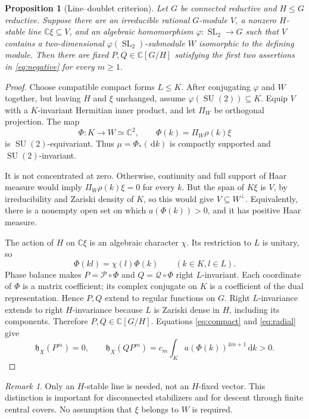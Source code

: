 \documentclass[11pt]{article}
\numberwithin{equation}{section}
\newtheorem{proposition}[theorem]{Proposition}
\theoremstyle{definition}
\theoremstyle{remark}
\newtheorem{remark}[theorem]{Remark}
\newcommand{\C}{\mathbb C}
\newcommand{\hX}{\mathfrak h_X}
\newcommand{\dd}{\,\mathrm d}
\DeclareMathOperator{\SL}{SL}
\DeclareMathOperator{\SU}{SU}
\begin{document}
\begin{proposition}[Line--doublet criterion]\label{prop:line}
Let $G$ be connected reductive and $H\leq G$ reductive. Suppose there are an irreducible rational $G$-module $V$, a nonzero $H$-stable line $\C\xi\subseteq V$, and an algebraic homomorphism $\varphi:\SL_2\to G$ such that $V$ contains a two-dimensional $\varphi(\SL_2)$-submodule $W$ isomorphic to the defining module. Then there are fixed $P,Q\in\C[G/H]$ satisfying the first two assertions in \eqref{eq:negative} for every $m\geq1$.
\end{proposition}
\begin{proof}
Choose compatible compact forms $L\leq K$. After conjugating $\varphi$ and $W$ together, but leaving $H$ and $\xi$ unchanged, assume $\varphi(\SU(2))\subseteq K$. Equip $V$ with a $K$-invariant Hermitian inner product, and let $\Pi_W$ be orthogonal projection. The map
\[
 \Phi:K\longrightarrow W\simeq\C^2,\qquad
 \Phi(k)=\Pi_W\rho(k)\xi
\]
is $\SU(2)$-equivariant. Thus $\mu=\Phi_*(\dd k)$ is compactly supported and $\SU(2)$-invariant.

It is not concentrated at zero. Otherwise, continuity and full support of Haar measure would imply $\Pi_W\rho(k)\xi=0$ for every $k$. But the span of $K\xi$ is $V$, by irreducibility and Zariski density of $K$, so this would give $V\subseteq W^\perp$. Equivalently, there is a nonempty open set on which $a(\Phi(k))>0$, and it has positive Haar measure.

The action of $H$ on $\C\xi$ is an algebraic character $\chi$. Its restriction to $L$ is unitary, so
\[
 \Phi(kl)=\chi(l)\Phi(k)\qquad(k\in K,l\in L).
\]
Phase balance makes $P=\mathscr P\circ\Phi$ and $Q=\mathscr Q\circ\Phi$ right $L$-invariant. Each coordinate of $\Phi$ is a matrix coefficient; its complex conjugate on $K$ is a coefficient of the dual representation. Hence $P,Q$ extend to regular functions on $G$. Right $L$-invariance extends to right $H$-invariance because $L$ is Zariski dense in $H$, including its components. Therefore $P,Q\in\C[G/H]$. Equations \eqref{eq:compact} and \eqref{eq:radial} give
\[
 \hX(P^m)=0,\qquad
 \hX(QP^m)=c_m\int_K a(\Phi(k))^{4m+1}\dd k>0.
\]
\end{proof}

\begin{remark}\label{rem:line}
Only an $H$-stable line is needed, not an $H$-fixed vector. This distinction is important for disconnected stabilizers and for descent through finite central covers. No assumption that $\xi$ belongs to $W$ is required.
\end{remark}
\end{document}
